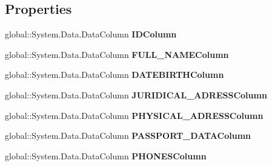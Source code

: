\subsection*{Properties}
\begin{CompactItemize}
\item 
global::System.Data.DataColumn \textbf{IDColumn}\hspace{0.3cm}{\tt  [get]}\label{class_automatic_medical_system_1_1_data_set1_1_1_v_f_a_m_i_l_y_d_o_c_t_o_r_r_e_c_o_r_d_s_data_table_d1898a458782de6215ce6ddb51b2ef6c}

\item 
global::System.Data.DataColumn \textbf{FULL\_\-NAMEColumn}\hspace{0.3cm}{\tt  [get]}\label{class_automatic_medical_system_1_1_data_set1_1_1_v_f_a_m_i_l_y_d_o_c_t_o_r_r_e_c_o_r_d_s_data_table_5f6fdd309e0c4d199d60af09ba1ce8ff}

\item 
global::System.Data.DataColumn \textbf{DATEBIRTHColumn}\hspace{0.3cm}{\tt  [get]}\label{class_automatic_medical_system_1_1_data_set1_1_1_v_f_a_m_i_l_y_d_o_c_t_o_r_r_e_c_o_r_d_s_data_table_885941984c419fbc426c74ab215062f8}

\item 
global::System.Data.DataColumn \textbf{JURIDICAL\_\-ADRESSColumn}\hspace{0.3cm}{\tt  [get]}\label{class_automatic_medical_system_1_1_data_set1_1_1_v_f_a_m_i_l_y_d_o_c_t_o_r_r_e_c_o_r_d_s_data_table_9be55aa8e1863289491032daa833a2c6}

\item 
global::System.Data.DataColumn \textbf{PHYSICAL\_\-ADRESSColumn}\hspace{0.3cm}{\tt  [get]}\label{class_automatic_medical_system_1_1_data_set1_1_1_v_f_a_m_i_l_y_d_o_c_t_o_r_r_e_c_o_r_d_s_data_table_47c9f5ae491d771f14bb920f74747833}

\item 
global::System.Data.DataColumn \textbf{PASSPORT\_\-DATAColumn}\hspace{0.3cm}{\tt  [get]}\label{class_automatic_medical_system_1_1_data_set1_1_1_v_f_a_m_i_l_y_d_o_c_t_o_r_r_e_c_o_r_d_s_data_table_d50a48e9f06ced4fc5975f96cd115539}

\item 
global::System.Data.DataColumn \textbf{PHONESColumn}\hspace{0.3cm}{\tt  [get]}\label{class_automatic_medical_system_1_1_data_set1_1_1_v_f_a_m_i_l_y_d_o_c_t_o_r_r_e_c_o_r_d_s_data_table_783ccb7649e8e07ea0edd120d7e934d0}


\end{CompactItemize}
